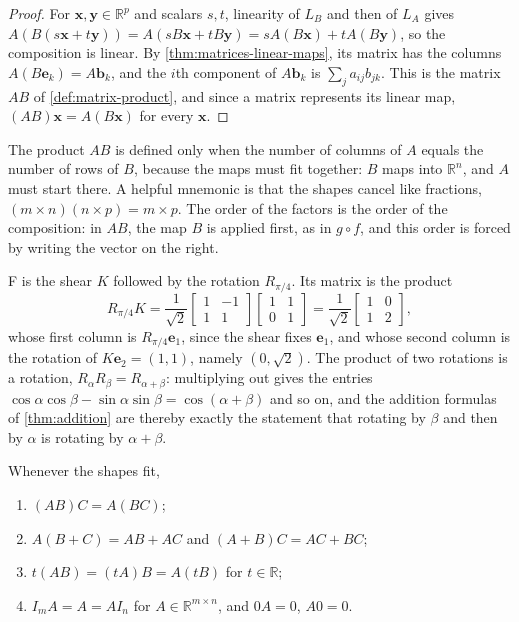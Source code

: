 \begin{proof}
For $\mathbf x,\mathbf y\in\mathbb R^p$ and scalars $s,t$, linearity of $L_B$ and then of $L_A$ gives $A(B(s\mathbf x+t\mathbf y))=A(sB\mathbf x+tB\mathbf y)=sA(B\mathbf x)+tA(B\mathbf y)$, so the composition is linear. By \cref{thm:matrices-linear-maps}, its matrix has the columns $A(B\mathbf e_k)=A\mathbf b_k$, and the $i$th component of $A\mathbf b_k$ is $\sum_ja_{ij}b_{jk}$. This is the matrix $AB$ of \cref{def:matrix-product}, and since a matrix represents its linear map, $(AB)\mathbf x=A(B\mathbf x)$ for every $\mathbf x$.
\end{proof}

The product $AB$ is defined only when the number of columns of $A$ equals the number of rows of $B$, because the maps must fit together: $B$ maps into $\mathbb R^n$, and $A$ must start there. A helpful mnemonic is that the shapes cancel like fractions, $(m\times n)(n\times p)=m\times p$. The order of the factors is the order of the composition: in $AB$, the map $B$ is applied first, as in $g\circ f$, and this order is forced by writing the vector on the right.

F is the shear $K$ followed by the rotation $R_{\pi/4}$. Its matrix is the product
\[
R_{\pi/4}K=\frac1{\sqrt2}\begin{bmatrix}1&-1\\1&1\end{bmatrix}\begin{bmatrix}1&1\\0&1\end{bmatrix}=\frac1{\sqrt2}\begin{bmatrix}1&0\\1&2\end{bmatrix},
\]
whose first column is $R_{\pi/4}\mathbf e_1$, since the shear fixes $\mathbf e_1$, and whose second column is the rotation of $K\mathbf e_2=(1,1)$, namely $(0,\sqrt2)$. The product of two rotations is a rotation, $R_\alpha R_\beta=R_{\alpha+\beta}$: multiplying out gives the entries $\cos\alpha\cos\beta-\sin\alpha\sin\beta=\cos(\alpha+\beta)$ and so on, and the addition formulas of \cref{thm:addition} are thereby exactly the statement that rotating by $\beta$ and then by $\alpha$ is rotating by $\alpha+\beta$.

\begin{theorem}
\label{thm:product-rules}
Whenever the shapes fit,
\begin{enumerate}
\item $(AB)C=A(BC)$;
\item $A(B+C)=AB+AC$ and $(A+B)C=AC+BC$;
\item $t(AB)=(tA)B=A(tB)$ for $t\in\mathbb R$;
\item $I_mA=A=AI_n$ for $A\in\mathbb R^{m\times n}$, and $0A=0$, $A0=0$.
\end{enumerate}
\end{theorem}

